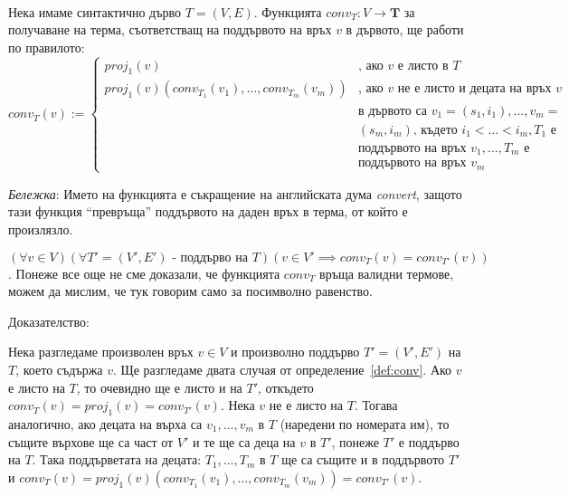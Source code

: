 \documentclass[12pt,twoside,a4paper]{article}
\begin{document}
	\begin{definition}\label{def:conv}~\\
		\indent Нека имаме синтактично дърво $T=(V,E)$. Функцията $conv_T \colon V \to \mathbf{T}$ за получаване на терма, съответстващ на поддървото на връх $v$ в дървото, ще работи по правилото:
		\begin{equation*}
			conv_T(v) :=
			\begin{cases}
				proj_1(v) & \text{, ако }v\text{ е листо в }T\\
				proj_1(v)(conv_{T_1}(v_1), \dots, conv_{T_m}(v_m)) & \text{, ако }v\text{ не е листо и децата на връх }v\\
				& \text{в дървото са }v_1=(s_1, i_1), \dots, v_m = \\
				& (s_m,i_m)\text{, където }i_1 < \dots < i_m, T_1\text{ е}\\
				& \text{поддървото на връх }v_1, \dots, T_m\text{ е}\\
				& \text{поддървото на връх }v_m
			\end{cases}
		\end{equation*}
		
		\textit{Бележка}: Името на функцията е съкращение на английската дума \textit{convert}, защото тази функция "`превръща"' поддървото на даден връх в терма, от който е произлязло.
	\end{definition}
	
	\begin{statement}\label{stmnt:conv-subtree-tree} $(\forall v \in V)(\forall T'=(V',E')\text{ - поддърво на }T)(v \in V' \implies conv_T(v) = conv_{T'}(v))$. Понеже все още не сме доказали, че функцията $conv_T$ връща валидни термове, можем да мислим, че тук говорим само за посимволно равенство.
		
		\noindent Доказателство:
		
		Нека разгледаме произволен връх $v \in V$ и произволно поддърво $T'=(V',E')$ на $T$, което съдържа $v$. Ще разгледаме двата случая от определение~\ref{def:conv}. Ако $v$ е листо на $T$, то очевидно ще е листо и на $T'$, откъдето $conv_T(v) = proj_1(v) = conv_{T'}(v)$. Нека $v$ не е листо на $T$. Тогава аналогично, ако децата на върха са $v_1, \dots, v_m$ в $T$ (наредени по номерата им), то същите върхове ще са част от $V'$ и те ще са деца на $v$ в $T'$, понеже $T'$ е поддърво на $T$. Така поддърветата на децата: $T_1, \dots, T_m$ в $T$ ще са същите и в поддървото $T'$ и $conv_T(v) = proj_1(v)(conv_{T_1}(v_1), \dots, conv_{T_m}(v_m)) = conv_{T'}(v)$.
	\end{statement}
	
\end{document}

